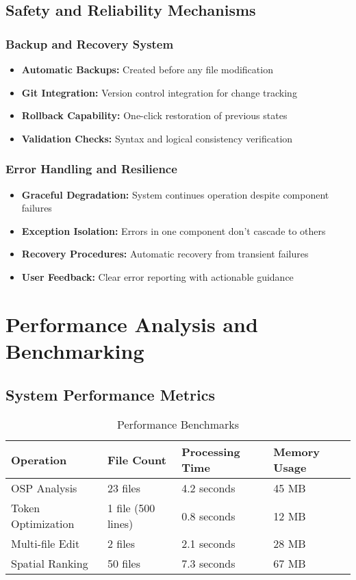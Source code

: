 \documentclass[12pt,a4paper]{article}
\begin{document}
\subsection{Safety and Reliability Mechanisms}

\subsubsection{Backup and Recovery System}
\begin{itemize}
    \item \textbf{Automatic Backups:} Created before any file modification
    \item \textbf{Git Integration:} Version control integration for change tracking
    \item \textbf{Rollback Capability:} One-click restoration of previous states
    \item \textbf{Validation Checks:} Syntax and logical consistency verification
\end{itemize}

\subsubsection{Error Handling and Resilience}
\begin{itemize}
    \item \textbf{Graceful Degradation:} System continues operation despite component failures
    \item \textbf{Exception Isolation:} Errors in one component don't cascade to others
    \item \textbf{Recovery Procedures:} Automatic recovery from transient failures
    \item \textbf{User Feedback:} Clear error reporting with actionable guidance
\end{itemize}

\section{Performance Analysis and Benchmarking}

\subsection{System Performance Metrics}

\begin{table}[H]
\centering
\caption{Performance Benchmarks}
\begin{tabularx}{\textwidth}{|l|X|X|X|}
\hline
\textbf{Operation} & \textbf{File Count} & \textbf{Processing Time} & \textbf{Memory Usage} \\
\hline
OSP Analysis & 23 files & 4.2 seconds & 45 MB \\
\hline
Token Optimization & 1 file (500 lines) & 0.8 seconds & 12 MB \\
\hline
Multi-file Edit & 2 files & 2.1 seconds & 28 MB \\
\hline
Spatial Ranking & 50 files & 7.3 seconds & 67 MB \\
\hline
\end{tabularx}
\end{table}
\end{document}
